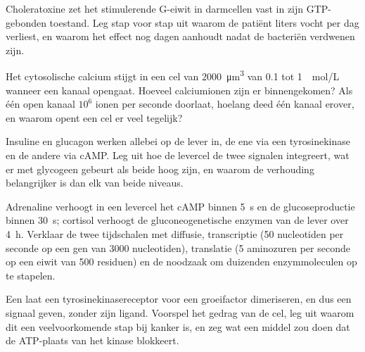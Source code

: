 \begin{exercise}[$\star\star$]\label{exo:b2:cell-signalling:7}
Choleratoxine zet het stimulerende G-eiwit in darmcellen vast in zijn
GTP-gebonden toestand. Leg stap voor stap uit waarom de patiënt liters vocht
per dag verliest, en waarom het effect nog dagen aanhoudt nadat de bacteriën
verdwenen zijn.
\end{exercise}

\begin{exercise}[$\star\star$]\label{exo:b2:cell-signalling:8}
Het cytosolische calcium stijgt in een cel van \qty{2000}{\micro m^3} van
\qty{0.1}{} tot \qty{1}{\micro
mol/L} wanneer een kanaal opengaat. Hoeveel calciumionen zijn er
binnengekomen? Als één open kanaal $10^{6}$ ionen per seconde doorlaat,
hoelang deed één kanaal erover, en waarom opent een cel er veel tegelijk?
\end{exercise}

\begin{exercise}[$\star\star$]\label{exo:b2:cell-signalling:9}
Insuline en glucagon werken allebei op de lever in, de ene via een
tyrosinekinase en de andere via cAMP. Leg uit hoe de levercel de twee signalen
integreert, wat er met glycogeen gebeurt als beide hoog zijn, en waarom de
verhouding belangrijker is dan elk van beide niveaus.
\end{exercise}

\begin{exercise}[$\star\star\star$]\label{exo:b2:cell-signalling:10}
Adrenaline verhoogt in een levercel het cAMP binnen \qty{5}{s} en de
glucoseproductie binnen \qty{30}{s}; cortisol verhoogt de gluconeogenetische
enzymen van de lever over \qty{4}{h}. Verklaar de twee tijdschalen met
diffusie, transcriptie (\qty{50}{} nucleotiden per seconde op een gen van
\qty{3000}{} nucleotiden), translatie (\qty{5}{} aminozuren per seconde op een
eiwit van \num{500} residuen) en de noodzaak om duizenden enzymmoleculen op
te stapelen.
\end{exercise}

\begin{exercise}[$\star\star\star$]\label{exo:b2:cell-signalling:11}
Een  laat een tyrosinekinasereceptor voor een groeifactor dimeriseren,
en dus een signaal geven, zonder zijn ligand. Voorspel het gedrag van de cel,
leg uit waarom dit een veelvoorkomende stap bij kanker is, en zeg wat een
middel zou doen dat de ATP-plaats van het kinase blokkeert.
\end{exercise}

